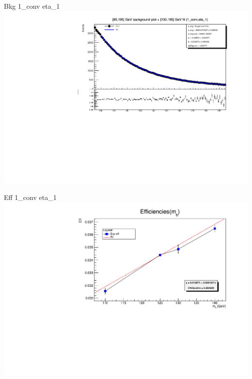\documentclass[10pt,UKenglish, leqno, xcolor = dvipsnames]{beamer}
\begin{document}
		\begin{frame}{Bkg 1\_conv eta\_1}
			\vfill
			\centering
			\includegraphics[width=1.\textwidth]{../images/week_10/bkg_100_195GeV_fit_1_conv_eta_1.pdf}
			\vfill
		\end{frame}
	
		\begin{frame}{Eff 1\_conv eta\_1}
			\vfill
			\includegraphics[width=1.\textwidth]{../images/week_10/efficiencies_fit_1_conv_eta_1.pdf}
			\vfill
		\end{frame}
	
\end{document}
